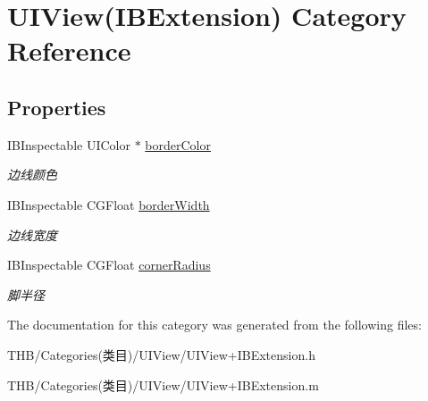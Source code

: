 \hypertarget{category_u_i_view_07_i_b_extension_08}{}\section{U\+I\+View(I\+B\+Extension) Category Reference}
\label{category_u_i_view_07_i_b_extension_08}
\subsection*{Properties}
\begin{DoxyCompactItemize}
\item 
\mbox{\label{category_u_i_view_07_i_b_extension_08_a802df101d91baf8261dc3f0c869e7afc}} 
I\+B\+Inspectable U\+I\+Color $\ast$ \mbox{\hyperlink{category_u_i_view_07_i_b_extension_08_a802df101d91baf8261dc3f0c869e7afc}{border\+Color}}
\begin{DoxyCompactList}\small\item\em 边线颜色 \end{DoxyCompactList}\item 
\mbox{\label{category_u_i_view_07_i_b_extension_08_a9ff2351ac6db99c72a403adea8648719}} 
I\+B\+Inspectable C\+G\+Float \mbox{\hyperlink{category_u_i_view_07_i_b_extension_08_a9ff2351ac6db99c72a403adea8648719}{border\+Width}}
\begin{DoxyCompactList}\small\item\em 边线宽度 \end{DoxyCompactList}\item 
\mbox{\label{category_u_i_view_07_i_b_extension_08_a2a0e7ce92e4f66681e980a212d691d51}} 
I\+B\+Inspectable C\+G\+Float \mbox{\hyperlink{category_u_i_view_07_i_b_extension_08_a2a0e7ce92e4f66681e980a212d691d51}{corner\+Radius}}
\begin{DoxyCompactList}\small\item\em 脚半径 \end{DoxyCompactList}\end{DoxyCompactItemize}


The documentation for this category was generated from the following files\+:\begin{DoxyCompactItemize}
\item 
T\+H\+B/\+Categories(类目)/\+U\+I\+View/U\+I\+View+\+I\+B\+Extension.\+h\item 
T\+H\+B/\+Categories(类目)/\+U\+I\+View/U\+I\+View+\+I\+B\+Extension.\+m\end{DoxyCompactItemize}
